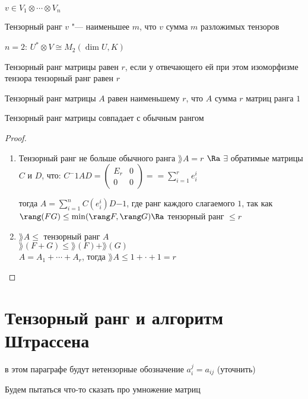 \begin{Def}
    $v \in V_1 \otimes \cdots \otimes V_n$

    Тензорный ранг $v$ "--- наименьшее $m$, что $v$ сумма $m$ разложимых тензоров
\end{Def}

$n = 2$: $U^* \otimes V \cong M_2(\dim U, K)$

\begin{Def}
Тензорный ранг матрицы равен $r$, если у отвечающего ей при этом изоморфизме тензора тензорный ранг равен $r$

Тензорный ранг матрицы $A$ равен наименьшему $r$, что $A$ сумма $r$ матриц ранга $1$
\end{Def}
\begin{theorem}
    Тензорный ранг матрицы совпадает с обычным рангом
\end{theorem}

\begin{proof}
    \begin{enumerate}
        \item Тензорный ранг не больше обычного ранга
            $\rang A = r$ $\Ra$ $\exists$ обратимые матрицы $C$ и $D$, что:
            $C^-1AD = 
            \begin{pmatrix}
                 E_r & 0 \\
                 0 & 0 
            \end{pmatrix} == \sum_{i = 1}^r e_i^i$

            тогда $A = \sum_{i=1}^n C(e_i^i)D{-1}$, где ранг каждого слагаемого $1$, так как
             $\rang (F G) \leq \min (\rang F, \rang G) \Ra$ тензорный ранг $\leq r$

        \item $\rang A \leq $ тензорный ранг $A$ \\
            $\rang(F + G) \leq \rang(F) + \rang(G)$ \\
            $A = A_1 + \cdots + A_r$, тогда $\rang A \leq 1 + \cdot + 1 = r$
    \end{enumerate}
\end{proof}

\section{Тензорный ранг и алгоритм Штрассена}

в этом параграфе будут нетензорные обозначение $a_i^j = a_{ij}$ (уточнить)

Будем пытаться что-то сказать про умножение матриц

